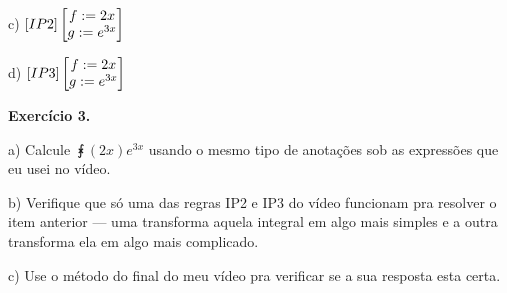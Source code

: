 \documentclass[oneside,12pt]{article}
\begin{document}
\ssk

c) $[IP2] \left [\begin{matrix} f:=2x \\ g:= e^{3x} \\\end{matrix}\right ]$

\ssk

d) $[IP3] \left [\begin{matrix} f:=2x \\ g:= e^{3x} \\\end{matrix}\right ]$

\newpage

{\bf Exercício 3.}

\ssk

a) Calcule $\intx {(2x) e^{3x}}$ usando o mesmo tipo de anotações sob
as expressões que eu usei no vídeo.

b) Verifique que só uma das regras IP2 e IP3 do vídeo funcionam pra
resolver o item anterior --- uma transforma aquela integral em algo
mais simples e a outra transforma ela em algo mais complicado.

c) Use o método do final do meu vídeo pra verificar se a sua resposta
esta certa.


\end{document}

